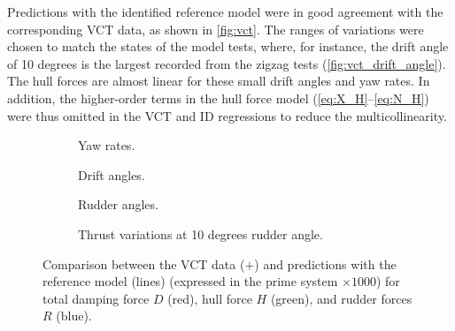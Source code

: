 Predictions with the identified reference model were in good agreement with the corresponding VCT data, as shown in \autoref{fig:vct}. The ranges of variations were chosen to match the states of the model tests, where, for instance, the drift angle of 10 degrees is the largest recorded from the zigzag tests (\autoref{fig:vct_drift_angle}). The hull forces are almost linear for these small drift angles and yaw rates. In addition, the higher-order terms in the hull force model (\autoref{eq:X_H}--\autoref{eq:N_H}) were thus omitted in the VCT and ID regressions to reduce the multicollinearity.
\begin{figure}
    \centering
    \begin{subfigure}[b]{0.49\textwidth}
        \centering
        
        \caption{Yaw rates.}
        \label{fig:vct_circle}
    \end{subfigure}
    \hfill
    \begin{subfigure}[b]{0.49\textwidth}
        \centering
        
        \caption{Drift angles.}
        \label{fig:vct_drift_angle}
    \end{subfigure}
    \begin{subfigure}[b]{0.49\textwidth}
        \centering
        
        \caption{Rudder angles.}
        \label{fig:vct_rudder_angle}
    \end{subfigure}
    \hfill
    \begin{subfigure}[b]{0.49\textwidth}
        \centering
        
        \caption{Thrust variations at 10 degrees rudder angle.}
        \label{fig:vct_thrust_variation}
    \end{subfigure}
    \caption{Comparison between the VCT data ($+$) and predictions with the reference model (lines) (expressed in the prime system $\times 1000$) for total damping force $D$ (red), hull force $H$ (green), and rudder forces $R$ (blue).}
    \label{fig:vct}
\end{figure}